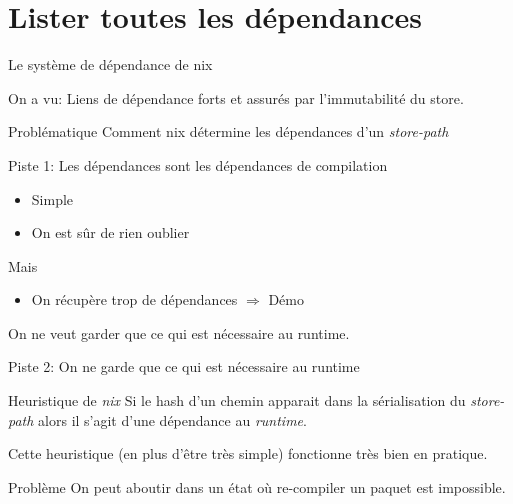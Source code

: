 \documentclass{beamer}
\begin{document}
\section{Lister toutes les dépendances}

\begin{frame}{Le système de dépendance de nix}

On a vu: Liens de dépendance forts et assurés par l'immutabilité du store.

\vspace{0.5cm}

\begin{block}{Problématique}
	Comment nix détermine les dépendances d'un \emph{store-path}
\end{block}

\end{frame}

\begin{frame}{Piste 1: Les dépendances sont les dépendances de compilation}

	\begin{itemize}
		\item Simple
		\item On est sûr de rien oublier
	\end{itemize}
	Mais
	\begin{itemize}
		\item On récupère trop de dépendances $\Rightarrow$ Démo
	\end{itemize}

	On ne veut garder que ce qui est nécessaire au runtime.

\end{frame}

\begin{frame}{Piste 2: On ne garde que ce qui est nécessaire au runtime}

	\begin{block}{Heuristique de \emph{nix}}
		Si le hash d'un chemin apparait dans la sérialisation du \emph{store-path} alors il s'agit d'une dépendance au \emph{runtime}.
	\end{block}

	Cette heuristique (en plus d'être très simple) fonctionne très bien en pratique.

	\begin{alert}{Problème}
		On peut aboutir dans un état où re-compiler un paquet est impossible.
	\end{alert}

\end{frame}
\end{document}
